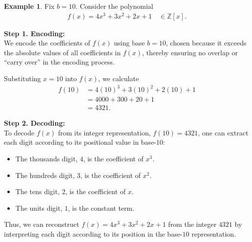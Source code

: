 \documentclass[12pt]{article}
\theoremstyle{plain}
\theoremstyle{definition}
\newtheorem{example}{Example}
\begin{document}
\begin{example}
Fix $b=10$. Consider the polynomial 
\begin{align*}
    f(x) = 4x^3 + 3x^2 + 2x + 1 \quad \in \mathbb{Z}[x] .
\end{align*}

\textbf{Step 1. Encoding:} \\
We encode the coefficients of $f(x)$ using base $b=10$, chosen because it exceeds the absolute values of all coefficients in $f(x)$, thereby ensuring no overlap or ``carry over'' in the encoding process.

Substituting $x = 10$ into $f(x)$, we calculate
\begin{align*}
    f(10) &= 4(10)^3 + 3(10)^2 + 2(10) + 1 \\
    &= 4000 + 300 + 20 + 1 \\
    &= 4321 .
\end{align*}

\textbf{Step 2. Decoding:} \\
To decode $f(x)$ from its integer representation, $f(10) = 4321$, one can extract each digit according to its positional value in base-$10$:
\begin{itemize}
    \item The thousands digit, $4$, is the coefficient of $x^3$.
    \item The hundreds digit, $3$, is the coefficient of $x^2$.
    \item The tens digit, $2$, is the coefficient of $x$.
    \item The units digit, $1$, is the constant term.
\end{itemize}

Thus, we can reconstruct $f(x) = 4x^3 + 3x^2 + 2x + 1$ from the integer $4321$ by interpreting each digit according to its position in the base-$10$ representation.
\end{example}

\begingroup
\raggedright


\endgroup
\end{document}
